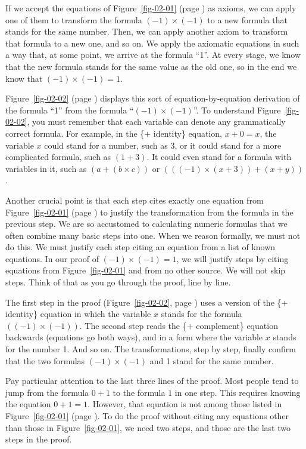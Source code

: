 If we accept the equations of Figure~\ref{fig-02-01} (page \pageref{fig-02-01}) as axioms,
we can apply one of them to transform the formula $(-1)\times(-1)$ to a new formula that
stands for the same number. Then, we can apply another axiom to
transform that formula to a new one, and so on. We apply the
axiomatic equations in such a way that, at some point, we
arrive at the formula ``1''. At every stage, we know that the
new formula stands for the same value as the old one, so in
the end we know that $(-1)\times(-1) = 1$.

Figure~\ref{fig-02-02} (page \pageref{fig-02-02})
displays this sort of equation-by-equation derivation of the
formula ``1'' from the formula ``$(-1)\times(-1)$''. To
understand Figure~\ref{fig-02-02}, you must remember that each
variable can denote any
grammatically correct formula. For example, in the
\{$+$ identity\} equation, $x + 0 = x$, the variable $x$ could stand for
a number, such as 3, or it could stand for a more complicated
formula, such as $(1 + 3)$. It could even stand for a formula
with variables in it, such as $(a + (b \times c))$ or
$(((-1) \times (x + 3)) + (x + y))$.

Another crucial point is that each step cites
exactly one equation from Figure~\ref{fig-02-01} (page \pageref{fig-02-01})
to justify the transformation from the formula in the previous step. We are so accustomed to calculating numeric formulas that we often combine many basic steps into one. When we reason formally, we must not do this. We must justify each step citing an equation from a list of known equations. In our proof of $(-1)\times(-1) = 1$, we will justify steps by citing equations from Figure~\ref{fig-02-01} and from no other source. We will not skip steps. Think of that as you go through the proof, line by line.

The first step in the proof (Figure~\ref{fig-02-02}, page \pageref{fig-02-02}) uses a version of the
\{$+$ identity\} equation in which the variable $x$ stands for the
formula $((-1)\times(-1))$. The second step reads the \{$+$ complement\}
equation backwards (equations go both ways), and in a form
where the variable $x$ stands for the number 1. And so on. The
transformations, step by step, finally confirm that the two formulas
$(-1)\times(-1)$ and 1 stand for the same number.

Pay particular attention to the last three lines of the proof.
Most people tend to jump from the formula $0+1$ to the formula $1$ in one step. This requires knowing the equation $0+1 = 1$. However, that equation is not among those listed in Figure~\ref{fig-02-01} (page \pageref{fig-02-01}). To do the proof without citing any equations other than those in Figure~\ref{fig-02-01}, we need two steps, and those are the last two steps in the proof.

